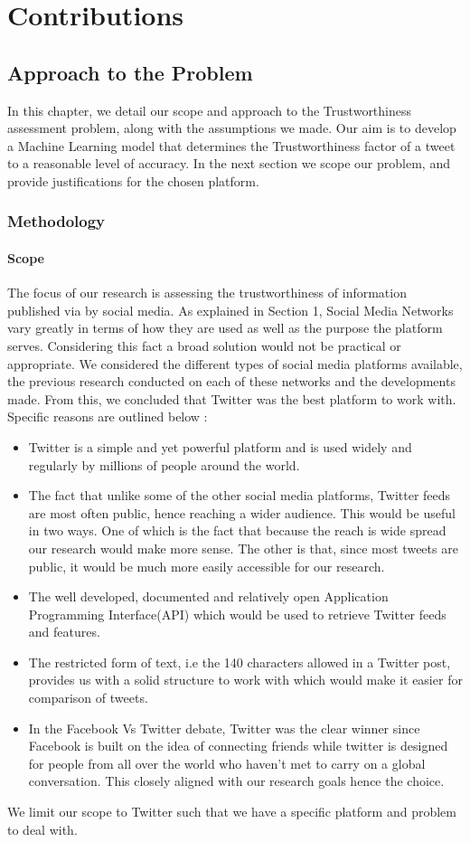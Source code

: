 \part{Contributions}
\chapter{Approach to the Problem}
In this chapter, we detail our scope and approach to the Trustworthiness assessment problem, along with the assumptions we made. Our aim is to develop a Machine Learning model that determines the Trustworthiness factor of a tweet to a reasonable level of accuracy. In the next section we scope our problem, and provide justifications for the chosen platform.   
\section{Methodology}
\subsection{Scope}
The focus of our research is assessing the trustworthiness of information published via by social media. As explained in Section 1, Social Media Networks vary greatly in terms of how they are used as well as the purpose the platform serves. Considering this fact a broad solution would not be practical or appropriate. We considered the different types of social media platforms available, the previous research conducted on each of these networks and the developments made. From this, we concluded that Twitter was the best platform to work with. Specific reasons are outlined below : 
\begin{itemize}
\item Twitter is a simple and yet powerful platform and is used widely and regularly by millions of people around the world. 
\item The fact that unlike some of the other social media platforms, Twitter feeds are most often public, hence reaching a wider audience. This would be useful in two ways. One of which is the fact that because the reach is wide spread our research would make more sense. The other is that, since most tweets are public, it would be much more easily accessible for our research. 
\item The well developed, documented and relatively open Application Programming Interface(API) which would be used to retrieve Twitter feeds and features. 
\item The restricted form of text, i.e the 140 characters allowed in a Twitter post, provides us with a solid structure to work with which would make it easier for comparison of tweets.
\item In the Facebook Vs Twitter debate, Twitter was the clear winner since Facebook is built on the idea of connecting friends while twitter is designed for people from all over the world who haven't met to carry on a global conversation\cite{22}. This closely aligned with our research goals hence the choice. 
\end{itemize}
We limit our scope to Twitter such that we have a specific platform and problem to deal with. 
